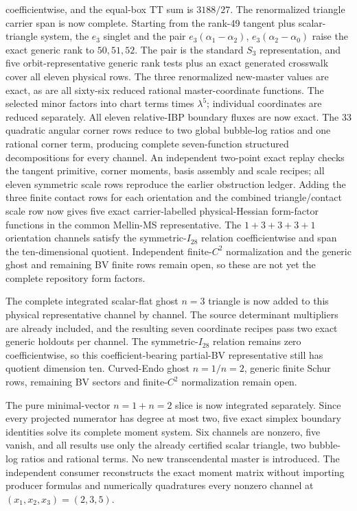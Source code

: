 \documentclass[11pt]{article}
\theoremstyle{definition}
\theoremstyle{remark}
\begin{document}
coefficientwise, and the equal-box TT sum is $3188/27$.  The renormalized
triangle carrier span is now complete.  Starting from the rank-49 tangent
plus scalar-triangle system, the $e_3$ singlet and the pair
$e_3(\alpha_1-\alpha_2)$, $e_3(\alpha_2-\alpha_0)$ raise the exact generic
rank to $50,51,52$.  The pair is the standard $S_3$ representation, and five
orbit-representative generic rank tests plus an exact generated crosswalk
cover all eleven physical rows.  The three renormalized new-master values are
exact, as are all sixty-six reduced rational master-coordinate functions.
The selected minor factors into chart terms times $\lambda^5$; individual
coordinates are reduced separately.  All eleven relative-IBP boundary fluxes
are now exact.  The 33 quadratic angular corner rows reduce to two global
bubble-log ratios and one rational corner term, producing complete
seven-function structured decompositions for every channel.  An independent
two-point exact replay checks the tangent primitive, corner moments, basis
assembly and scale recipes; all eleven symmetric scale rows reproduce the
earlier obstruction ledger.  Adding the three finite contact rows for each
orientation and the combined triangle/contact scale row now gives five exact
carrier-labelled physical-Hessian form-factor functions in the common
Mellin-MS representative.  The $1+3+3+3+1$ orientation channels satisfy the
symmetric-$I_{28}$ relation coefficientwise and span the ten-dimensional
quotient.  Independent finite-$C^2$ normalization and the generic ghost and
remaining BV finite rows remain open, so these are not yet the complete
repository form factors.

The complete integrated scalar-flat ghost $n=3$ triangle is now added to
this physical representative channel by channel.  The source determinant
multipliers are already included, and the resulting seven coordinate recipes
pass two exact generic holdouts per channel.  The symmetric-$I_{28}$ relation
remains zero coefficientwise, so this coefficient-bearing partial-BV
representative still has quotient dimension ten.  Curved-Endo ghost
$n=1/n=2$, generic finite Schur rows, remaining BV sectors and finite-$C^2$
normalization remain open.

The pure minimal-vector $n=1+n=2$ slice is now integrated separately.  Since
every projected numerator has degree at most two, five exact simplex boundary
identities solve its complete moment system.  Six channels are nonzero, five
vanish, and all results use only the already certified scalar triangle, two
bubble-log ratios and rational terms.  No new transcendental master is
introduced.  The independent consumer reconstructs the exact moment matrix
without importing producer formulas and numerically quadratures every
nonzero channel at $(x_1,x_2,x_3)=(2,3,5)$.
\end{document}
